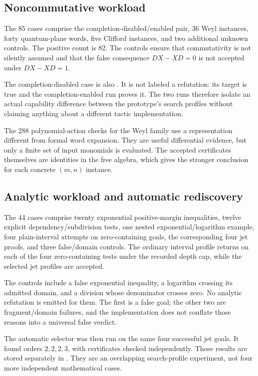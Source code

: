 \subsection{Noncommutative workload}
The 85 cases comprise the completion-disabled/enabled pair, 36 Weyl instances, forty quantum-plane words, five Clifford instances, and two additional unknown controls. The positive count is 82. The controls ensure that commutativity is not silently assumed and that the false consequence \(DX-XD=0\) is not accepted under \(DX-XD=1\).

The completion-disabled case is also \unknown{}. It is not labeled a refutation: its target is true and the completion-enabled run proves it. The two runs therefore isolate an actual capability difference between the prototype's search profiles without claiming anything about a different tactic implementation.

The 288 polynomial-action checks for the Weyl family use a representation different from formal word expansion. They are useful differential evidence, but only a finite set of input monomials is evaluated. The accepted certificates themselves are identities in the free algebra, which gives the stronger conclusion for each concrete \((m,n)\) instance.

\subsection{Analytic workload and automatic rediscovery}
The 44 cases comprise twenty exponential positive-margin inequalities, twelve explicit dependency/subdivision tests, one nested exponential/logarithm example, four plain-interval attempts on zero-containing goals, the corresponding four jet proofs, and three false/domain controls. The ordinary interval profile returns \unknown{} on each of the four zero-containing tests under the recorded depth cap, while the selected jet profiles are accepted.

The controls include a false exponential inequality, a logarithm crossing its admitted domain, and a division whose denominator crosses zero. No analytic refutation is emitted for them. The first is a false goal; the other two are fragment/domain failures, and the implementation does not conflate those reasons into a universal false verdict.

The automatic selector was then run on the same four successful jet goals. It found orders \(2,2,2,3\), with certificates checked independently. Those results are stored separately in . They are an overlapping search-profile experiment, not four more independent mathematical cases.

